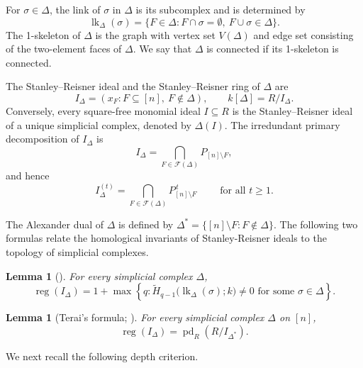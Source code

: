 \documentclass[12pt]{amsart}
\newtheorem{lemma}[proposition]{Lemma}
\newtheorem{theorem}[proposition]{Theorem}
\DeclareMathOperator{\pd}{pd}
\DeclareMathOperator{\reg}{reg}
\DeclareMathOperator{\lk}{lk}
\begin{document}
For \(\sigma\in\Delta\), the link of \(\sigma\) in \(\Delta\) is its subcomplex and is determined by
\[
\lk_\Delta(\sigma)
=
\{F\in\Delta:F\cap\sigma=\emptyset,\ F\cup\sigma\in\Delta\}.
\]
The 1-skeleton of $\Delta$ is the graph with vertex set $V(\Delta)$ and edge set consisting of the two-element faces of $\Delta$. We say that $\Delta$ is connected if its 1-skeleton is connected.

The Stanley--Reisner ideal and the Stanley--Reisner ring of \(\Delta\) are
\[
I_\Delta=(x_F:F\subseteq[n],\ F\notin\Delta),
\qquad
k[\Delta]=R/I_\Delta.
\]
Conversely, every square-free monomial ideal \(I\subseteq R\) is the Stanley--Reisner ideal of a unique simplicial complex, denoted by \(\Delta(I)\). The irredundant primary decomposition of \(I_\Delta\) is
\[
I_\Delta
=
\bigcap_{F\in\mathcal F(\Delta)}P_{[n]\setminus F},
\]
and hence
\[
I_\Delta^{(t)}
=
\bigcap_{F\in\mathcal F(\Delta)}
P_{[n]\setminus F}^{\,t}
\qquad \text{ for all } t\ge1 .
\]

The Alexander dual of \(\Delta\) is defined by
$\Delta^*
=
\{[n]\setminus F:F\notin\Delta\}.$ The following two formulas relate the homological invariants of Stanley-Reisner ideals to the topology of simplicial complexes.

\begin{lemma}[{\cite[Theorem~13.13]{MS}}]\label{Hochster-Reg}
For every simplicial complex \(\Delta\),
\[
\reg(I_\Delta)
=
1+\max\left\{
q:
\widetilde H_{q-1}\bigl(\lk_\Delta(\sigma);k\bigr)\ne0
\text{ for some }\sigma\in\Delta
\right\}.
\]
\end{lemma}

\begin{lemma}[Terai's formula;  {\cite{T1}}]\label{TeraiF}
For every simplicial complex \(\Delta\) on \([n]\),
\[
\reg(I_\Delta)=\pd_R(R/I_{\Delta^*}).
\]
\end{lemma}

We next recall the following depth criterion.
\end{document}
